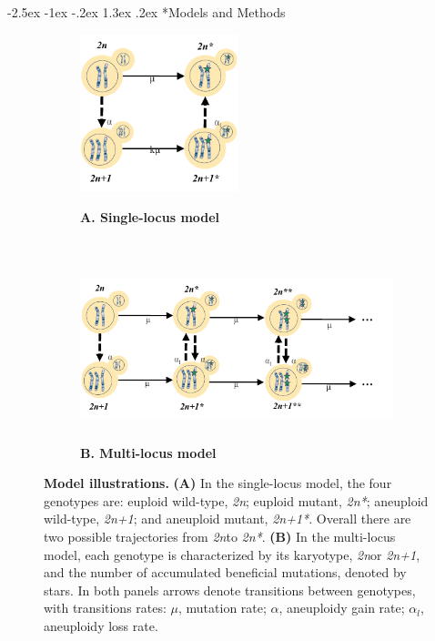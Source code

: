 \documentclass[12pt]{extarticle}
\makeatletter
\renewcommand\section{\@startsection {section}{1}{\z@}%
     {-2.5ex \@plus -1ex \@minus -.2ex}%
     {1.3ex \@plus.2ex}%
    {\Large\bfseries}}
\newcommand{\euwt}{\emph{2n}}
\newcommand{\anwt}{\emph{2n+1}}
\newcommand{\eumt}{\emph{2n*}}
\newcommand{\anmt}{\emph{2n+1*}}
\makeatother
\begin{document}
\pagebreak
\section*{Models and Methods}

\begin{figure}[b!]
  \centering
  \begin{subfigure}[t]{0.5\textwidth}
      \caption{
        \textbf{A. Single-locus model}
      }
      \centering
      \includegraphics[height=1.8in]{../figures/Fig1-A.pdf}      
      \label{fig:model1}
  \end{subfigure}%
  \\
  \begin{subfigure}[t]{0.5\textwidth}
  	  \caption{
        \textbf{B. Multi-locus model}
      }
      \centering
      \includegraphics[height=1.8in]{../figures/Fig1-B.pdf}      
      \label{fig:model2}
  \end{subfigure}
  \caption{
    \textbf{Model illustrations.}
    \textbf{(A)} In the single-locus model, the four genotypes are: euploid wild-type, \euwt; euploid mutant, \eumt; aneuploid wild-type, \anwt; and aneuploid mutant, \anmt.
    Overall there are two possible trajectories from \euwt to \eumt.
    \textbf{(B)} In the multi-locus model, each genotype is characterized by its karyotype, \euwt or \anwt, and the number of accumulated beneficial mutations, denoted by stars. 
    In both panels arrows denote transitions between genotypes, with transitions rates: $\mu$, mutation rate; $\alpha$, aneuploidy gain rate; $\alpha_l$, aneuploidy loss rate.
  }
  \label{fig:models}
\end{figure}
\end{document}
